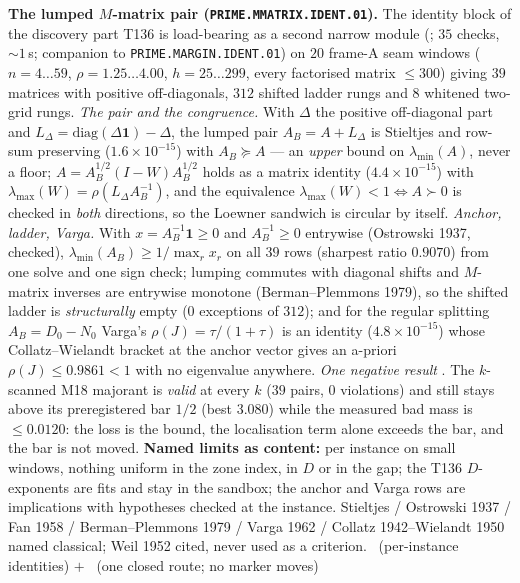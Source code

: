 \documentclass[11pt,a4paper]{article}
\theoremstyle{definition}
\begin{document}
\par\smallskip\noindent\textbf{The lumped $M$-matrix pair
(\texttt{PRIME.MMATRIX.IDENT.01}).}
The identity block of the discovery part T136 is load-bearing as a second narrow
module (; $35$ checks, ${\sim}1$\,s;
companion to \texttt{PRIME.MARGIN.IDENT.01}) on $20$ frame-A seam windows
($n=4\ldots59$, $\rho=1.25\ldots4.00$, $h=25\ldots299$, every factorised matrix
$\le300$) giving $39$ matrices with positive off-diagonals, $312$ shifted ladder
rungs and $8$ whitened two-grid rungs.
\emph{The pair and the congruence.} With $\Delta$ the positive off-diagonal part
and $L_\Delta=\mathrm{diag}(\Delta\mathbf 1)-\Delta$, the lumped pair
$A_B=A+L_\Delta$ is Stieltjes and row-sum preserving ($1.6\times10^{-15}$) with
$A_B\succeq A$ --- an \emph{upper} bound on $\lambda_{\min}(A)$, never a floor;
$A=A_B^{1/2}(I-W)A_B^{1/2}$ holds as a matrix identity ($4.4\times10^{-15}$) with
$\lambda_{\max}(W)=\rho(L_\Delta A_B^{-1})$, and the equivalence
$\lambda_{\max}(W)<1\iff A\succ0$ is checked in \emph{both} directions, so the
Loewner sandwich is circular by itself.
\emph{Anchor, ladder, Varga.} With $x=A_B^{-1}\mathbf 1\ge0$ and $A_B^{-1}\ge0$
entrywise (Ostrowski 1937, checked), $\lambda_{\min}(A_B)\ge1/\max_r x_r$ on all
$39$ rows (sharpest ratio $0.9070$) from one solve and one sign check; lumping
commutes with diagonal shifts and $M$-matrix inverses are entrywise monotone
(Berman--Plemmons 1979), so the shifted ladder is \emph{structurally} empty
($0$ exceptions of $312$); and for the regular splitting $A_B=D_0-N_0$ Varga's
$\rho(J)=\tau/(1+\tau)$ is an identity ($4.8\times10^{-15}$) whose
Collatz--Wielandt bracket at the anchor vector gives an a-priori
$\rho(J)\le0.9861<1$ with no eigenvalue anywhere.
\emph{One negative result} \mX. The $k$-scanned M18 majorant is \emph{valid} at
every $k$ ($39$ pairs, $0$ violations) and still stays above its preregistered
bar $1/2$ (best $3.080$) while the measured bad mass is $\le0.0120$: the loss is
the bound, the localisation term alone exceeds the bar, and the bar is not moved.
\textbf{Named limits as content:} per instance on small windows, nothing uniform
in the zone index, in $D$ or in the gap; the T136 $D$-exponents are fits and stay
in the sandbox; the anchor and Varga rows are implications with hypotheses
checked at the instance.
Stieltjes / Ostrowski 1937 / Fan 1958 / Berman--Plemmons 1979 / Varga 1962 /
Collatz 1942--Wielandt 1950 named classical; Weil 1952 cited, never used as a
criterion.
\mE\ (per-instance identities) $+$ \mX\ (one closed route; no marker moves)
\end{document}
